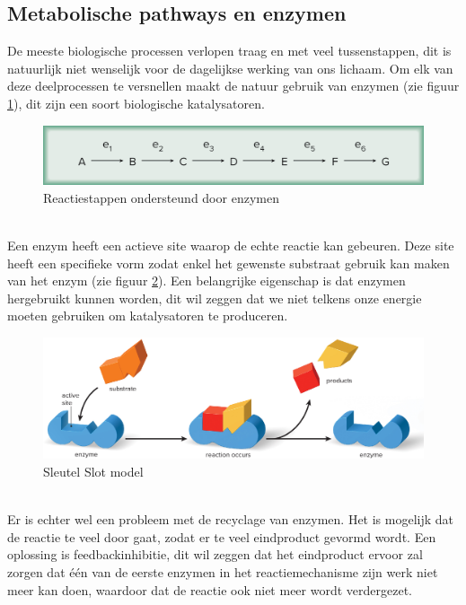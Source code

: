 \documentclass[a4paper,kul]{kulakarticle} %
\begin{document}
\subsection{Metabolische pathways en enzymen}
\label{sec:enzymen}
De meeste biologische processen verlopen traag en met veel tussenstappen, dit is natuurlijk niet wenselijk voor de dagelijkse werking van ons lichaam. Om elk van deze deelprocessen te versnellen maakt de natuur gebruik van enzymen (zie figuur \ref{fig:enzymenstappen}), dit zijn een soort biologische katalysatoren. 
\begin{figure}[h]
	\centering
	\includegraphics[width=0.7\linewidth]{EnzymenStappen}
	\caption[Enzymen]{Reactiestappen ondersteund door enzymen}
	\label{fig:enzymenstappen}
\end{figure}\\
Een enzym heeft een actieve site waarop de echte reactie kan gebeuren. Deze site heeft een specifieke vorm zodat enkel het gewenste substraat gebruik kan maken van het enzym (zie figuur \ref{fig:sleutelslot}). Een belangrijke eigenschap is dat enzymen hergebruikt kunnen worden, dit wil zeggen dat we niet telkens onze energie moeten gebruiken om katalysatoren te produceren. 
\begin{figure}[h]
	\centering
	\includegraphics[width=0.7\linewidth]{SleutelSlot}
	\caption[Sleutel Slot]{Sleutel Slot model}
	\label{fig:sleutelslot}
\end{figure} \\
Er is echter wel een probleem met de recyclage van enzymen. Het is mogelijk dat de reactie te veel door gaat, zodat er te veel eindproduct gevormd wordt. Een oplossing is feedbackinhibitie, dit wil zeggen dat het eindproduct ervoor zal zorgen dat één van de eerste enzymen in het reactiemechanisme zijn werk niet meer kan doen, waardoor dat de reactie ook niet meer wordt verdergezet. \\
\end{document}
